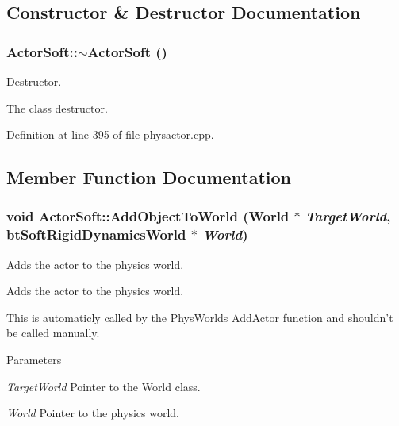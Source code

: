\subsection{Constructor \& Destructor Documentation}
\hypertarget{classActorSoft_af58881c064fa2182a2347eb8755696b0}{
\subsubsection[{$\sim$ActorSoft}]{\setlength{\rightskip}{0pt plus 5cm}ActorSoft::$\sim$ActorSoft ()}}
\label{d5/da4/classActorSoft_af58881c064fa2182a2347eb8755696b0}


Destructor. 

The class destructor. 

Definition at line 395 of file physactor.cpp.



\subsection{Member Function Documentation}
\hypertarget{classActorSoft_a2c9b96e757040add73272ed392c3a464}{
\subsubsection[{AddObjectToWorld}]{\setlength{\rightskip}{0pt plus 5cm}void ActorSoft::AddObjectToWorld ({\bf World} $\ast$ {\em TargetWorld}, \/  btSoftRigidDynamicsWorld $\ast$ {\em World})}}
\label{d5/da4/classActorSoft_a2c9b96e757040add73272ed392c3a464}


Adds the actor to the physics world. 

Adds the actor to the physics world. \par
 This is automaticly called by the PhysWorlds AddActor function and shouldn't be called manually. 
\begin{DoxyParams}{Parameters}
\item[{\em TargetWorld}]Pointer to the World class. \item[{\em World}]Pointer to the physics world. \end{DoxyParams}


